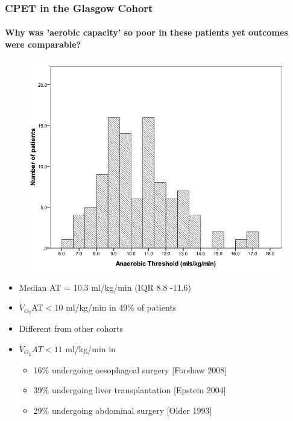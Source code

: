 \documentclass[10pt]{beamer}
\begin{document}
\begin{frame}
	\frametitle{CPET in the Glasgow Cohort}
	\framesubtitle{Why was 'aerobic capacity' so poor in these patients yet outcomes were comparable?}
	\begin{figure}
		\centering
		\includegraphics[height=0.35\textheight]{../Figures/cpet_outcomes_dist_of_AT}
	\end{figure}

	\begin{itemize}
		\item Median AT = 10.3 ml/kg/min (IQR 8.8 -11.6)
		\item $\dot{V}_{O_2}$AT$<$10 ml/kg/min in 49\% of patients
		\item Different from other cohorts
		\item $\dot{V}_{O_2}AT<11$ ml/kg/min in
		\begin{itemize}
			\item 16\% undergoing oesophageal surgery [Forshaw 2008]
			\item 39\% undergoing liver transplantation [Epstein 2004]
			\item 29\% undergoing abdominal surgery [Older 1993]
		\end{itemize}
	\end{itemize}
\end{frame}
\end{document}
